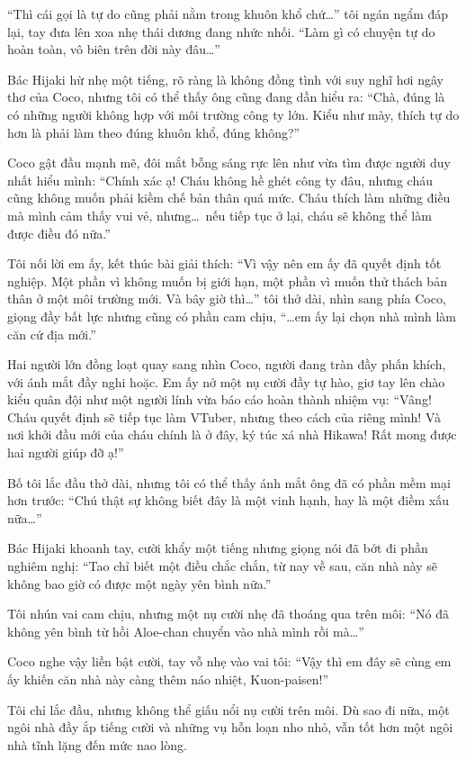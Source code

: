 \documentclass[../main.tex]{subfiles}
\begin{document}
``Thì cái gọi là tự do cũng phải nằm trong khuôn khổ chứ\dots'' tôi ngán ngẩm đáp lại, tay đưa lên xoa nhẹ thái dương đang nhức nhối. ``Làm gì có chuyện tự do hoàn toàn, vô biên trên đời này đâu\dots''

Bác Hijaki hừ nhẹ một tiếng, rõ ràng là không đồng tình với suy nghĩ hơi ngây thơ của Coco, nhưng tôi có thể thấy ông cũng đang dần hiểu ra: ``Chà, đúng là có những người không hợp với môi trường công ty lớn. Kiểu như mày, thích tự do hơn là phải làm theo đúng khuôn khổ, đúng không?''

Coco gật đầu mạnh mẽ, đôi mắt bỗng sáng rực lên như vừa tìm được người duy nhất hiểu mình: ``Chính xác ạ! Cháu không hề ghét công ty đâu, nhưng cháu cũng không muốn phải kiềm chế bản thân quá mức. Cháu thích làm những điều mà mình cảm thấy vui vẻ, nhưng\dots\ nếu tiếp tục ở lại, cháu sẽ không thể làm được điều đó nữa.''

Tôi nối lời em ấy, kết thúc bài giải thích: ``Vì vậy nên em ấy đã quyết định tốt nghiệp. Một phần vì không muốn bị giới hạn, một phần vì muốn thử thách bản thân ở một môi trường mới. Và bây giờ thì\dots'' tôi thở dài, nhìn sang phía Coco, giọng đầy bất lực nhưng cũng có phần cam chịu, ``\dots em ấy lại chọn nhà mình làm căn cứ địa mới.''

Hai người lớn đồng loạt quay sang nhìn Coco, người đang tràn đầy phấn khích, với ánh mắt đầy nghi hoặc. Em ấy nở một nụ cười đầy tự hào, giơ tay lên chào kiểu quân đội như một người lính vừa báo cáo hoàn thành nhiệm vụ: ``Vâng! Cháu quyết định sẽ tiếp tục làm VTuber, nhưng theo cách của riêng mình! Và nơi khởi đầu mới của cháu chính là ở đây, ký túc xá nhà Hikawa! Rất mong được hai người giúp đỡ ạ!''

Bố tôi lắc đầu thở dài, nhưng tôi có thể thấy ánh mắt ông đã có phần mềm mại hơn trước: ``Chú thật sự không biết đây là một vinh hạnh, hay là một điềm xấu nữa\dots''

Bác Hijaki khoanh tay, cười khẩy một tiếng nhưng giọng nói đã bớt đi phần nghiêm nghị: ``Tao chỉ biết một điều chắc chắn, từ nay về sau, căn nhà này sẽ không bao giờ có được một ngày yên bình nữa.''

Tôi nhún vai cam chịu, nhưng một nụ cười nhẹ đã thoáng qua trên môi: ``Nó đã không yên bình từ hồi Aloe-chan chuyển vào nhà mình rồi mà\dots''

Coco nghe vậy liền bật cười, tay vỗ nhẹ vào vai tôi: ``Vậy thì em đây sẽ cùng em ấy khiến căn nhà này càng thêm náo nhiệt, Kuon-paisen!''

Tôi chỉ lắc đầu, nhưng không thể giấu nổi nụ cười trên môi. Dù sao đi nữa, một ngôi nhà đầy ắp tiếng cười và những vụ hỗn loạn nho nhỏ, vẫn tốt hơn một ngôi nhà tĩnh lặng đến mức nao lòng.
\end{document}
